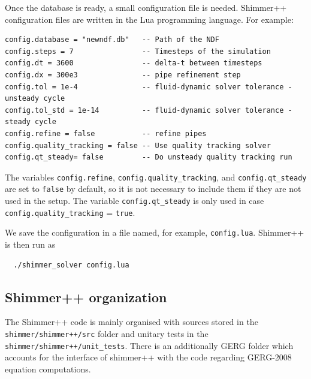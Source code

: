 Once the database is ready, a small configuration file is needed. Shimmer++ configuration files are written in the Lua programming language. For example:

\begin{verbatim}
config.database = "newndf.db"   -- Path of the NDF
config.steps = 7                -- Timesteps of the simulation
config.dt = 3600                -- delta-t between timesteps
config.dx = 300e3               -- pipe refinement step
config.tol = 1e-4               -- fluid-dynamic solver tolerance - unsteady cycle 
config.tol_std = 1e-14          -- fluid-dynamic solver tolerance - steady cycle 
config.refine = false           -- refine pipes
config.quality_tracking = false -- Use quality tracking solver
config.qt_steady= false         -- Do unsteady quality tracking run 
\end{verbatim}
The variables \texttt{config.refine}, \texttt{config.quality\_tracking}, and \texttt{config.qt\_steady} are set to \texttt{false} by default, so it is not necessary to include them if they are not used in the setup. The variable \texttt{config.qt\_steady}  is only used in case \texttt{config.quality\_tracking} = \texttt{true}.

We save the configuration in a file named, for example, \texttt{config.lua}. Shimmer++ is then
run as
\begin{verbatim}
  ./shimmer_solver config.lua
\end{verbatim}

\subsection{Shimmer++ organization}
The Shimmer++ code is mainly organised with sources stored in the \texttt{shimmer/shimmer++/src} folder and unitary tests in the \texttt{shimmer/shimmer++/unit\_tests}. There is an additionally GERG folder which accounts for the interface of shimmer++ with the code regarding GERG-2008 equation computations.


